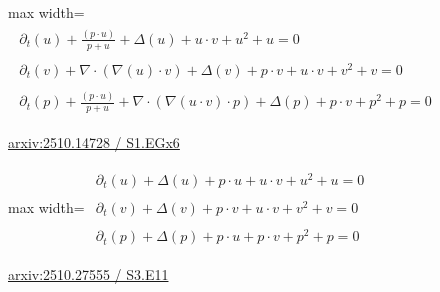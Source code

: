 \documentclass[UTF8,10pt,a4paper,fontset=mac]{ctexart}
\begin{document}
\begin{minipage}{\linewidth}\begin{center}\begin{adjustbox}{max width=\linewidth}$\displaystyle\begin{gathered}\begin{gathered}\partial_{t}(u)+\frac{(p\cdot u)}{p+u}+\Delta(u)+u\cdot v+u^{2}+u=0\end{gathered}\\[5pt]\begin{gathered}\partial_{t}(v)+\nabla\cdot(\nabla(u)\cdot v)+\Delta(v)+p\cdot v+u\cdot v+v^{2}+v=0\end{gathered}\\[5pt]\begin{gathered}\partial_{t}(p)+\frac{(p\cdot u)}{p+u}+\nabla\cdot(\nabla(u\cdot v)\cdot p)+\Delta(p)+p\cdot v+p^{2}+p=0\end{gathered}\end{gathered}$\end{adjustbox}\end{center}{\small\href{https://arxiv.org/html/2510.14728#S1.EGx6}{arxiv:2510.14728 / S1.EGx6}}\par\end{minipage}\par\vspace{6mm}

\begin{minipage}{\linewidth}\begin{center}\begin{adjustbox}{max width=\linewidth}$\displaystyle\begin{gathered}\begin{gathered}\partial_{t}(u)+\Delta(u)+p\cdot u+u\cdot v+u^{2}+u=0\end{gathered}\\[5pt]\begin{gathered}\partial_{t}(v)+\Delta(v)+p\cdot v+u\cdot v+v^{2}+v=0\end{gathered}\\[5pt]\begin{gathered}\partial_{t}(p)+\Delta(p)+p\cdot u+p\cdot v+p^{2}+p=0\end{gathered}\end{gathered}$\end{adjustbox}\end{center}{\small\href{https://arxiv.org/html/2510.27555#S3.E11}{arxiv:2510.27555 / S3.E11}}\par\end{minipage}\par\vspace{6mm}
\end{document}
